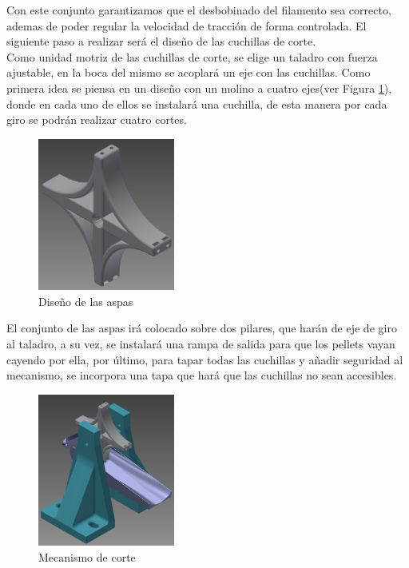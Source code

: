 Con este conjunto garantizamos que el desbobinado del filamento sea correcto, ademas de poder regular la velocidad de tracción de forma controlada. El siguiente paso a realizar será el diseño de las cuchillas de corte.\\

Como unidad motriz de las cuchillas de corte, se elige un taladro con fuerza ajustable, en la boca del mismo se acoplará un eje con las cuchillas. Como primera idea se piensa en un diseño con un molino a cuatro ejes(ver Figura \ref{fig:peletizadora_aspas}), donde en cada uno de ellos se instalará una cuchilla, de esta manera por cada giro se podrán realizar cuatro cortes.

\begin{figure}[H]
    \centering
    \includegraphics[width=0.4\textwidth]{images/peletizadora/aspas.png}
    \caption{Diseño de las aspas}
    \label{fig:peletizadora_aspas}
\end{figure}

El conjunto de las aspas irá colocado sobre dos pilares, que harán de eje de giro al taladro, a su vez, se instalará una rampa de salida para que los pellets vayan cayendo por ella, por último, para tapar todas las cuchillas y añadir seguridad al mecanismo, se incorpora una tapa que hará que las cuchillas no sean accesibles.

\begin{figure}[H]
    \centering
    \includegraphics[width=0.4\textwidth]{images/peletizadora/corte.png}
    \caption{Mecanismo de corte}
    \label{fig:peletizadora_corte}
\end{figure}

